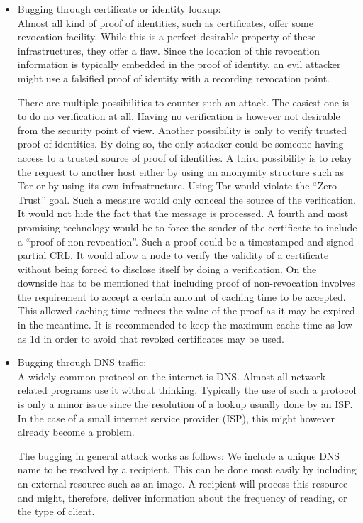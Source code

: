 \begin{itemize}
	\item Bugging through certificate or identity lookup:\\
	      Almost all kind of proof of identities, such as certificates, offer some revocation facility. While this is a perfect desirable property of these infrastructures, they offer a flaw. Since the location of this revocation information is typically embedded in the proof of identity, an evil attacker might use a falsified proof of identity with a recording revocation point.
	      
	      There are multiple possibilities to counter such an attack. The easiest one is to do no verification at all. Having no verification is however not desirable from the security point of view. Another possibility is only to verify trusted proof of identities. By doing so, the only attacker could be someone having access to a trusted source of proof of identities. A third possibility is to relay the request to another host either by using an anonymity structure such as Tor or by using its own infrastructure. Using Tor would violate the ``Zero Trust'' goal. Such a measure would only conceal the source of the verification. It would not hide the fact that the message is processed. A fourth and most promising technology would be to force the sender of the certificate to include a ``proof of non-revocation''. Such a proof could be a timestamped and signed partial CRL. It would allow a node to verify the validity of a certificate without being forced to disclose itself by doing a verification. On the downside has to be mentioned that including proof of non-revocation involves the requirement to accept a certain amount of caching time to be accepted. This allowed caching time reduces the value of the proof as it may be expired in the meantime. It is recommended to keep the maximum cache time as low as 1d in order to avoid that revoked certificates may be used. 

    \item Bugging through DNS traffic:\\
          A widely common protocol on the internet is DNS. Almost all network related programs use it without thinking. Typically the use of such a protocol is only a minor issue since the resolution of a lookup usually done by an ISP. In the case of a small internet service provider (ISP), this might however already become a problem.
          
          The bugging in general attack works as follows: We include a unique DNS name to be resolved by a recipient. This can be done most easily by including an external resource such as an image. A recipient will process this resource and might, therefore, deliver information about the frequency of reading, or the type of client. 
          

\end{itemize}
